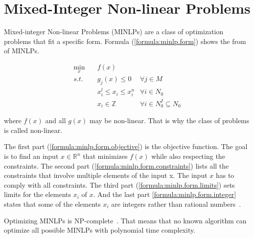 \section{Mixed-Integer Non-linear Problems}
\label{fundamentals:minlp}

Mixed-integer Non-linear Problems (MINLPs) are a class of optimization problems that fit a specific form.
Formula (\ref{formula:minlp.form}) shows the from of MINLPs.

\begin{subequations}
  \begin{align}
    \min_x \quad
    & f(x)
    \label{formula:minlp.form.objective}
    \\
    s.t. \quad
    & g_j(x) \leq 0
    & \forall j \in M
    \label{formula:minlp.form.constraints}
    \\
    & x_i^l \leq x_i \leq x_i^u
    & \forall i \in N_0
    \label{formula:minlp.form.limits}
    \\
    & x_i \in \mathbb{Z}
    & \forall i \in N_0^I \subseteq N_0
    \label{formula:minlp.form.integer}
  \end{align}
  \label{formula:minlp.form}
\end{subequations}

where $f(x)$ and all $g(x)$ may be non-linear.
That is why the class of problems is called non-linear.

The first part (\ref{formula:minlp.form.objective}) is the objective function.
The goal is to find an input $x \in \mathbb{R}^n$ that minimizes $f(x)$ while also respecting the constraints.
The second part (\ref{formula:minlp.form.constraints}) lists all the constraints that involve multiple elements of the input x.
The input $x$ has to comply with all constraints.
The third part (\ref{formula:minlp.form.limits}) sets limits for the elements $x_i$ of $x$.
And the last part \ref{formula:minlp.form.integer} states that some of the elements $x_i$ are integers rather than rational numbers~\cite{Belotti2009}.

Optimizing MINLPs is NP-complete~\cite{Bienstock1996}.
That means that no known algorithm can optimize all possible MINLPs with polynomial time complexity.
